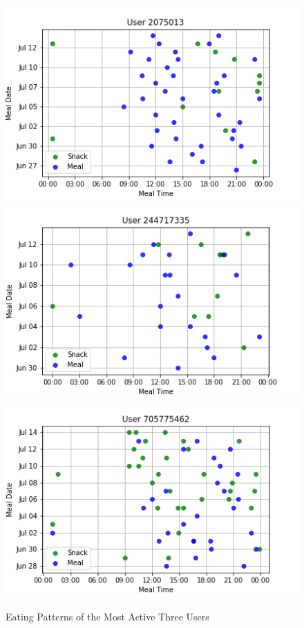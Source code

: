 \begin{figure}[htbp]
  \centering
  \captionsetup{width=.9\linewidth}
  \includegraphics[scale=0.6]{figures/2075013_pattern}
  \includegraphics[scale=0.6]{figures/244717335_pattern}
  \includegraphics[scale=0.6]{figures/705775462_pattern}
  \caption{Eating Patterns of the Most Active Three Users}
  \label{fig:user-pattern}
\end{figure}

